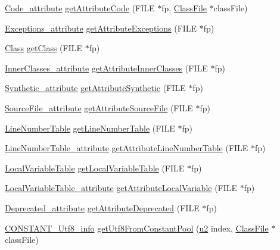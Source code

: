 \begin{DoxyCompactItemize}
\item 
\hyperlink{structCode__attribute}{Code\+\_\+attribute} \hyperlink{classLeitorExibidor_a3ebd90beea3ea327aa7d22b84357c4d0}{get\+Attribute\+Code} (F\+I\+LE $\ast$fp, \hyperlink{classClassFile}{Class\+File} $\ast$class\+File)
\item 
\hyperlink{structExceptions__attribute}{Exceptions\+\_\+attribute} \hyperlink{classLeitorExibidor_a36e7bb07a50754e6236dd555654d9032}{get\+Attribute\+Exceptions} (F\+I\+LE $\ast$fp)
\item 
\hyperlink{structClass}{Class} \hyperlink{classLeitorExibidor_a331d5d793343e29a8180771a4d2aa29c}{get\+Class} (F\+I\+LE $\ast$fp)
\item 
\hyperlink{structInnerClasses__attribute}{Inner\+Classes\+\_\+attribute} \hyperlink{classLeitorExibidor_a466d543f9134cc30ab471b359e19e765}{get\+Attribute\+Inner\+Classes} (F\+I\+LE $\ast$fp)
\item 
\hyperlink{structSynthetic__attribute}{Synthetic\+\_\+attribute} \hyperlink{classLeitorExibidor_a96f65a9e09e511128366ec9a1407ecb1}{get\+Attribute\+Synthetic} (F\+I\+LE $\ast$fp)
\item 
\hyperlink{structSourceFile__attribute}{Source\+File\+\_\+attribute} \hyperlink{classLeitorExibidor_a265f56dc5c7eb8cfc9471435735c2145}{get\+Attribute\+Source\+File} (F\+I\+LE $\ast$fp)
\item 
\hyperlink{structLineNumberTable}{Line\+Number\+Table} \hyperlink{classLeitorExibidor_ae0197a46804ec6e06829f53439f6c563}{get\+Line\+Number\+Table} (F\+I\+LE $\ast$fp)
\item 
\hyperlink{structLineNumberTable__attribute}{Line\+Number\+Table\+\_\+attribute} \hyperlink{classLeitorExibidor_a3b8b5cdf9d3f583088496091ab3d53c7}{get\+Attribute\+Line\+Number\+Table} (F\+I\+LE $\ast$fp)
\item 
\hyperlink{structLocalVariableTable}{Local\+Variable\+Table} \hyperlink{classLeitorExibidor_a4b4d4ae7d4d68d9b0869cf0141965a43}{get\+Local\+Variable\+Table} (F\+I\+LE $\ast$fp)
\item 
\hyperlink{structLocalVariableTable__attribute}{Local\+Variable\+Table\+\_\+attribute} \hyperlink{classLeitorExibidor_a95ba6c34c4225f737bf0571f065de7aa}{get\+Attribute\+Local\+Variable} (F\+I\+LE $\ast$fp)
\item 
\hyperlink{structDeprecated__attribute}{Deprecated\+\_\+attribute} \hyperlink{classLeitorExibidor_aa39f3fc481e6182eea0461d218ad6ec9}{get\+Attribute\+Deprecated} (F\+I\+LE $\ast$fp)
\item 
\hyperlink{structCONSTANT__Utf8__info}{C\+O\+N\+S\+T\+A\+N\+T\+\_\+\+Utf8\+\_\+info} \hyperlink{classLeitorExibidor_ad3299334f937507986cef571036b93c0}{get\+Utf8\+From\+Constant\+Pool} (\hyperlink{BasicTypes_8h_a732cde1300aafb73b0ea6c2558a7a54f}{u2} index, \hyperlink{classClassFile}{Class\+File} $\ast$class\+File)

\end{DoxyCompactItemize}
